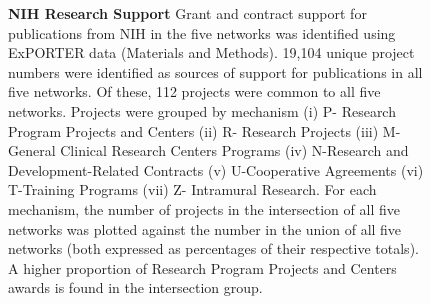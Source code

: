 \documentclass[10pt,letterpaper]{article}
\begin{document}
\begin{figure}[!h]
\centering
\caption{{\bf NIH Research Support} Grant and contract support for publications from NIH in the five networks was identified using ExPORTER data (Materials and Methods). 19,104 unique project numbers were identified as sources of support for publications in all five networks. Of these, 112 projects were common to all five networks. Projects were grouped by mechanism (i) P-  Research Program Projects and Centers (ii) R- Research Projects (iii) M-General Clinical Research Centers Programs (iv) N-Research and Development-Related Contracts (v) U-Cooperative Agreements (vi) T-Training Programs (vii) Z- Intramural Research. For each mechanism, the number of projects in the intersection of all five networks was plotted against the number in the union of all five networks (both expressed as percentages of their respective totals). A higher proportion of Research Program Projects and Centers awards is found in the intersection group.}
\label{fig3}
\end{figure}
\end{document}
